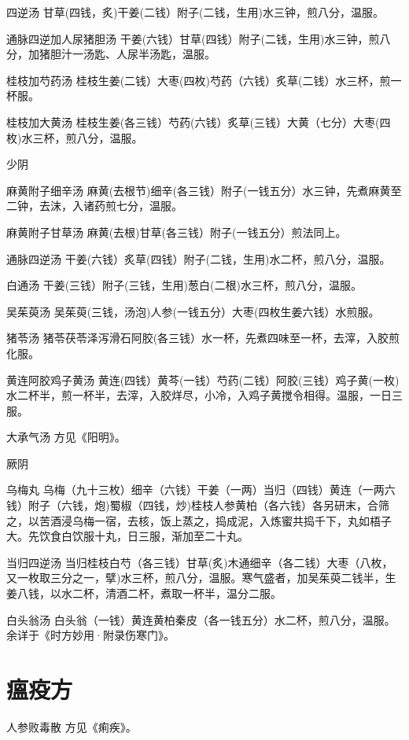 \documentclass[a4paper,12pt,UTF8,twoside]{ctexbook}
\begin{document}
	四逆汤
	甘草(四钱，炙)干姜(二钱）附子(二钱，生用)水三钟，煎八分，温服。
	
	通脉四逆加人尿猪胆汤
	干姜(六钱）甘草(四钱）附子(二钱，生用)水三钟，煎八分，加猪胆汁一汤匙、人尿半汤匙，温服。
	
	桂枝加芍药汤
	桂枝生姜(二钱）大枣(四枚)芍药（六钱）炙草(二钱）水三杯，煎一杯服。
	
	桂枝加大黄汤
	桂枝生姜(各三钱）芍药(六钱）炙草(三钱）大黄（七分）大枣(四枚)水三杯，煎八分，温服。
	
	
	少阴	
	
	麻黄附子细辛汤
	麻黄(去根节)细辛(各三钱）附子(一钱五分）水三钟，先煮麻黄至二钟，去沫，入诸药煎七分，温服。
	
	麻黄附子甘草汤
	麻黄(去根)甘草(各三钱）附子(一钱五分）煎法同上。
	
	通脉四逆汤
	干姜(六钱）炙草(四钱）附子(二钱，生用)水二杯，煎八分，温服。
	
	白通汤
	干姜(三钱）附子(三钱，生用)葱白(二根)水三杯，煎八分，温服。
	
	吴茱萸汤
	吴茱萸(三钱，汤泡)人参(一钱五分）大枣(四枚生姜六钱）水煎服。
	
	猪苓汤
	猪苓茯苓泽泻滑石阿胶(各三钱）水一杯，先煮四味至一杯，去滓，入胶煎化服。
	
	黄连阿胶鸡子黄汤
	黄连(四钱）黄芩(一钱）芍药(二钱）阿胶(三钱）鸡子黄(一枚)水二杯半，煎一杯半，去滓，入胶烊尽，小冷，入鸡子黄搅令相得。温服，一日三服。
	
	大承气汤
	方见《阳明》。
	
	
	厥阴	
	
	乌梅丸
	乌梅（九十三枚）细辛（六钱）干姜（一两）当归（四钱）黄连（一两六钱）附子（六钱，炮)蜀椒（四钱，炒)桂枝人参黄柏（各六钱）各另研末，合筛之，以苦酒浸乌梅一宿，去核，饭上蒸之，捣成泥，入炼蜜共捣千下，丸如梧子大。先饮食白饮服十丸，日三服，渐加至二十丸。
	
	当归四逆汤
	当归桂枝白芍（各三钱）甘草(炙)木通细辛（各二钱）大枣（八枚，又一枚取三分之一，擘)水三杯，煎八分，温服。寒气盛者，加吴茱萸二钱半，生姜八钱，以水二杯，清酒二杯，煮取一杯半，温分二服。
	
	白头翁汤
	白头翁（一钱）黄连黄柏秦皮（各一钱五分）水二杯，煎八分，温服。余详于《时方妙用·附录伤寒门》。
	
	

	\chapter{瘟疫方}	
	
	人参败毒散
	方见《痢疾》。
	
\end{document}
